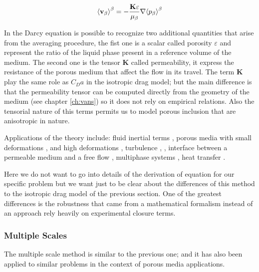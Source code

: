 \begin{equation}
{\left< \textbf{v}_{\beta} \right>}^{\beta} = -\dfrac{\mathbf{K} \varepsilon}{\mu_{\beta}} \nabla {\left< p_{\beta} \right>}^{\beta}
\label{eq:darcyeq}
\end{equation} 

In the Darcy equation is possible to recognize two additional quantities that arise from the averaging procedure, the fist one is a scalar called porosity $\varepsilon$ and represent the ratio of the liquid phase present in a reference volume of the medium.
The second one is the tensor $\mathbf{K}$ called permeability, it express the resistance of the porous medium that affect the flow in its travel.
The term $\mathbf{K}$ play the same role as $C_D a$ in the isotropic drag model; but the main difference is that the permeability tensor can be computed directly from the geometry of the medium (see chapter \ref{ch:vans}) so it does not rely on empirical relations.
Also the tensorial nature of this terms permits us to model porous inclusion that are anisotropic in nature.

Applications of the theory include: fluid inertial terms \citet{whitaker1996forchheimer}, porous media with small deformations \cite{whitaker1986flow2}, and high deformations \citet{hussong2011continuum}, turbulence \citet{soulaine2014}, \citet{breugem2006influence}, interface between a permeable medium and a free flow \citet{beavers1967boundary}, multiphase systems \citet{whitaker1973transport}, heat transfer \citet{carbonell1984heat}.

Here we do not want to go into details of the derivation of equation for our specific problem but we want just to be clear about the differences of this method to the isotropic drag model of the previous section.
One of the greatest differences is the robustness that came from a mathematical formalism instead of an approach rely heavily on experimental closure terms.

\subsubsection{Multiple Scales}

The multiple scale method is similar to the previous one; and it has also been applied to similar problems in the context of porous media applications.

